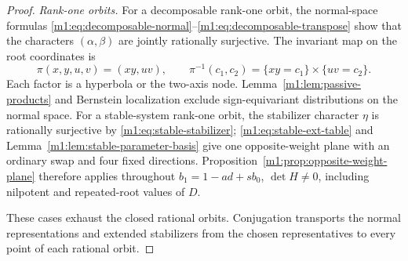 \begin{proof}
\emph{Rank-one orbits.}
For a decomposable rank-one orbit, the normal-space formulas
\eqref{m1:eq:decomposable-normal}--\eqref{m1:eq:decomposable-transpose}
show that the characters $(\alpha,\beta)$ are jointly rationally surjective.
The invariant map on the root coordinates is
\begin{equation}\label{m1:eq:decomposable-fiber-map}
 \pi(x,y,u,v)=(xy,uv),\qquad
 \pi^{-1}(c_1,c_2)=\{xy=c_1\}\times\{uv=c_2\}.
\end{equation}
Each factor is a hyperbola or the two-axis node. Lemma~\ref{m1:lem:passive-products} and Bernstein
localization exclude sign-equivariant distributions on the normal space. For a stable-system rank-one orbit, the stabilizer character $\eta$
is rationally surjective
by \eqref{m1:eq:stable-stabilizer};
\eqref{m1:eq:stable-ext-table} and
Lemma~\ref{m1:lem:stable-parameter-basis} give one opposite-weight
plane with an ordinary swap and four fixed directions.
Proposition~\ref{m1:prop:opposite-weight-plane} therefore applies
throughout $b_1=1-ad+sb_0$, $\det H\ne0$, including nilpotent and
repeated-root values of $D$.

These cases exhaust the closed rational orbits. Conjugation transports
the normal representations and extended stabilizers from the chosen
representatives to every point of each rational orbit.
\end{proof}

